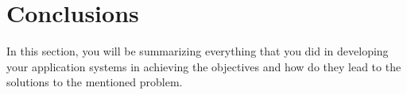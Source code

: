 \section{Conclusions}

In this section, you will be summarizing everything that you did in developing your application systems in achieving the objectives and how
do they lead to the solutions to the mentioned problem.